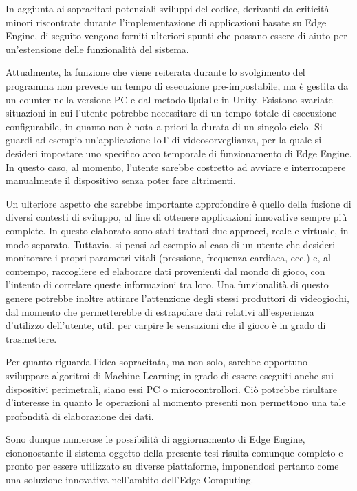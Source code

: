 In aggiunta ai sopracitati potenziali sviluppi del codice, derivanti da criticità minori riscontrate durante l’implementazione di applicazioni basate su Edge Engine, di seguito vengono forniti ulteriori spunti che possano essere di aiuto per un’estensione delle funzionalità del sistema.

Attualmente, la funzione che viene reiterata durante lo svolgimento del programma non prevede un tempo di esecuzione pre-impostabile, ma è gestita da un counter nella versione PC e dal metodo \texttt{Update} in Unity. Esistono svariate situazioni in cui l’utente potrebbe necessitare di un tempo totale di esecuzione configurabile, in quanto non è nota a priori la durata di un singolo ciclo. Si guardi ad esempio un’applicazione IoT di videosorveglianza, per la quale si desideri impostare uno specifico arco temporale di funzionamento di Edge Engine. In questo caso, al momento, l’utente sarebbe costretto ad avviare e interrompere manualmente il dispositivo senza poter fare altrimenti.

Un ulteriore aspetto che sarebbe importante approfondire è quello della fusione di diversi contesti di sviluppo, al fine di ottenere applicazioni innovative sempre più complete. In questo elaborato sono stati trattati due approcci, reale e virtuale, in modo separato. Tuttavia, si pensi ad esempio al caso di un utente che desideri monitorare i propri parametri vitali (pressione, frequenza cardiaca, ecc.) e, al contempo, raccogliere ed elaborare dati provenienti dal mondo di gioco, con l’intento di correlare queste informazioni tra loro. Una funzionalità di questo genere potrebbe inoltre attirare l’attenzione degli stessi produttori di videogiochi, dal momento che permetterebbe di estrapolare dati relativi all'esperienza d’utilizzo dell'utente, utili per carpire le sensazioni che il gioco è in grado di trasmettere.

Per quanto riguarda l’idea sopracitata, ma non solo, sarebbe opportuno sviluppare algoritmi di Machine Learning in grado di essere eseguiti anche sui dispositivi perimetrali, siano essi PC o microcontrollori. Ciò potrebbe risultare d’interesse in quanto le operazioni al momento presenti non permettono una tale profondità di elaborazione dei dati.

Sono dunque numerose le possibilità di aggiornamento di Edge Engine, ciononostante il sistema oggetto della presente tesi risulta comunque completo e pronto per essere utilizzato su diverse piattaforme, imponendosi pertanto come una soluzione innovativa nell'ambito dell'Edge Computing.
